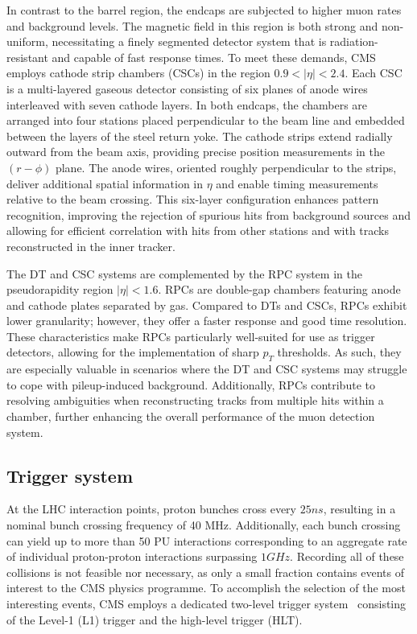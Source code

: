 In contrast to the barrel region, the endcaps are subjected to higher muon rates and background levels. The magnetic field in this region is both strong and non-uniform, necessitating a finely segmented detector system that is radiation-resistant and capable of fast response times. To meet these demands, CMS employs cathode strip chambers (CSCs) in the region $0.9 < |\eta|<2.4$. Each CSC is a multi-layered gaseous detector consisting of six planes of anode wires interleaved with seven cathode layers. In both endcaps, the chambers are arranged into four stations placed perpendicular to the beam line and embedded between the layers of the steel return yoke. The cathode strips extend radially outward from the beam axis, providing precise position measurements in the $(r-\phi)$ plane. The anode wires, oriented roughly perpendicular to the strips, deliver additional spatial information in $\eta$ and enable timing measurements relative to the beam crossing. This six-layer configuration enhances pattern recognition, improving the rejection of spurious hits from background sources and allowing for efficient correlation with hits from other stations and with tracks reconstructed in the inner tracker.

The DT and CSC systems are complemented by the RPC system in the pseudorapidity region $|\eta| < 1.6$. RPCs are double-gap chambers featuring anode and cathode plates separated by gas. Compared to DTs and CSCs, RPCs exhibit lower granularity; however, they offer a faster response and good time resolution. These characteristics make RPCs particularly well-suited for use as trigger detectors, allowing for the implementation of sharp $p_T$ thresholds. As such, they are especially valuable in scenarios where the DT and CSC systems may struggle to cope with pileup-induced background. Additionally, RPCs contribute to resolving ambiguities when reconstructing tracks from multiple hits within a chamber, further enhancing the overall performance of the muon detection system.

\subsection{Trigger system}

At the LHC interaction points, proton bunches cross every $25\unit{ns}$, resulting in a nominal bunch crossing frequency of 40 MHz. Additionally, each bunch crossing can yield up to more than 50 PU interactions corresponding to an aggregate rate of individual proton-proton interactions surpassing $1\unit{GHz}$. Recording all of these collisions is not feasible nor necessary, as only a small fraction contains events of interest to the CMS physics programme. To accomplish the selection of the most interesting events, CMS employs a dedicated two-level trigger system~\cite{CMS_Trigger} consisting of the Level-1 (L1) trigger and the high-level trigger (HLT).

